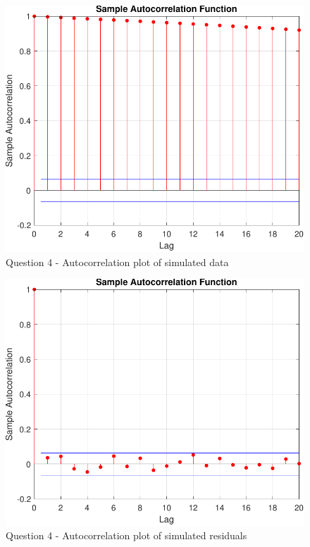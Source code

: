 \documentclass[11pt]{article}
\begin{document}
\begin{enumerate}
\begin{figure}[htp]
\begin{center}
\includegraphics[scale=0.75]{data-simulated-autocorrelation-plot.pdf}
\caption{Question 4 - Autocorrelation plot of simulated data}
\label{fig:q4-data-simulated-autocorrplot}
\end{center}
\end{figure}

\begin{figure}[htp]
\begin{center}
\includegraphics[scale=0.75]{residual-simulated-autocorrelation-plot.pdf}
\caption{Question 4 - Autocorrelation plot of simulated residuals}
\label{fig:q4-residual-simulated-autocorrplot}
\end{center}
\end{figure}


\end{enumerate}
\end{document}
